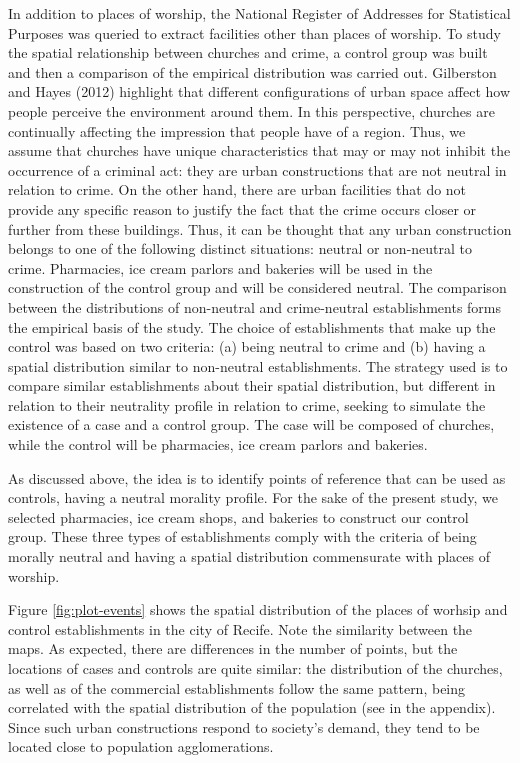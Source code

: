 \documentclass[smallextended]{svjour3}       %
\begin{document}
In addition to places of worship, the National Register of Addresses for
Statistical Purposes was queried to extract facilities other than places
of worship. To study the spatial relationship between churches and
crime, a control group was built and then a comparison of the empirical
distribution was carried out. Gilberston and Hayes (2012) highlight that
different configurations of urban space affect how people perceive the
environment around them. In this perspective, churches are continually
affecting the impression that people have of a region. Thus, we assume
that churches have unique characteristics that may or may not inhibit
the occurrence of a criminal act: they are urban constructions that are
not neutral in relation to crime. On the other hand, there are urban
facilities that do not provide any specific reason to justify the fact
that the crime occurs closer or further from these buildings. Thus, it
can be thought that any urban construction belongs to one of the
following distinct situations: neutral or non-neutral to crime.
Pharmacies, ice cream parlors and bakeries will be used in the
construction of the control group and will be considered neutral. The
comparison between the distributions of non-neutral and crime-neutral
establishments forms the empirical basis of the study. The choice of
establishments that make up the control was based on two criteria: (a)
being neutral to crime and (b) having a spatial distribution similar to
non-neutral establishments. The strategy used is to compare similar
establishments about their spatial distribution, but different in
relation to their neutrality profile in relation to crime, seeking to
simulate the existence of a case and a control group. The case will be
composed of churches, while the control will be pharmacies, ice cream
parlors and bakeries.

As discussed above, the idea is to identify points of reference that can
be used as controls, having a neutral morality profile. For the sake of
the present study, we selected pharmacies, ice cream shops, and bakeries
to construct our control group. These three types of establishments
comply with the criteria of being morally neutral and having a spatial
distribution commensurate with places of worship.

Figure \ref{fig:plot-events} shows the spatial distribution of the
places of worhsip and control establishments in the city of Recife. Note
the similarity between the maps. As expected, there are differences in
the number of points, but the locations of cases and controls are quite
similar: the distribution of the churches, as well as of the commercial
establishments follow the same pattern, being correlated with the
spatial distribution of the population (see in the appendix). Since such
urban constructions respond to society's demand, they tend to be located
close to population agglomerations.
\end{document}
